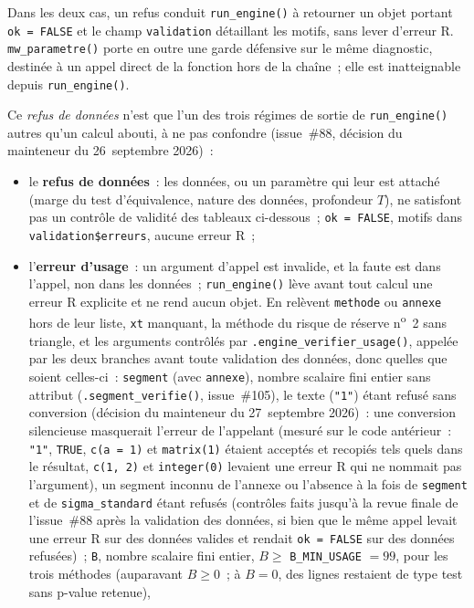 \documentclass[a4paper,11pt]{article}
\newcommand{\code}[1]{\texttt{\small #1}}
\begin{document}
Dans les deux cas, un refus conduit \code{run\_engine()} à
retourner un objet portant \code{ok = FALSE} et le champ \code{validation}
détaillant les motifs, sans lever d'erreur R.
\code{mw\_parametre()} porte en outre une garde défensive sur le même
diagnostic, destinée à un appel direct de la fonction hors de la chaîne~; elle
est inatteignable depuis \code{run\_engine()}.

Ce \emph{refus de données} n'est que l'un des trois régimes de sortie de \code{run\_engine()}
autres qu'un calcul abouti, à ne pas confondre (issue~\#88, décision du mainteneur du
26~septembre 2026)~:
\begin{itemize}[itemsep=2pt]
\item le \textbf{refus de données}~: les données, ou un paramètre qui leur est attaché (marge du
  test d'équivalence, nature des données, profondeur $T$), ne satisfont pas un contrôle de
  validité des tableaux ci-dessous~; \code{ok = FALSE}, motifs dans
  \code{validation\$erreurs}, aucune erreur R~;
\item l'\textbf{erreur d'usage}~: un argument d'appel est invalide, et la faute est dans l'appel,
  non dans les données~; \code{run\_engine()} lève avant tout calcul une erreur R explicite et ne
  rend aucun objet. En relèvent \code{methode} ou \code{annexe} hors de leur liste, \code{xt}
  manquant, la méthode du risque de réserve n\textsuperscript{o}~2 sans triangle, et les
  arguments contrôlés par \code{.engine\_verifier\_usage()}, appelée par les deux branches avant
  toute validation des données, donc quelles que soient celles-ci~: \code{segment} (avec
  \code{annexe}), nombre scalaire fini entier sans attribut (\code{.segment\_verifie()},
  issue~\#105), le texte (\code{"1"}) étant refusé sans conversion (décision du mainteneur du
  27~septembre 2026)~: une conversion silencieuse masquerait l'erreur de l'appelant (mesuré sur
  le code antérieur~: \code{"1"}, \code{TRUE}, \code{c(a = 1)} et \code{matrix(1)} étaient
  acceptés et recopiés tels quels dans le résultat, \code{c(1, 2)} et \code{integer(0)} levaient
  une erreur R qui ne nommait pas l'argument), un segment inconnu de l'annexe ou l'absence à la fois de \code{segment} et de
  \code{sigma\_standard} étant refusés (contrôles faits jusqu'à la revue finale de l'issue~\#88
  après la validation des données, si bien que le même appel levait une erreur R sur des données
  valides et rendait \code{ok = FALSE} sur des données refusées)~;
  \code{B}, nombre scalaire fini entier, $B \ge$ \code{B\_MIN\_USAGE} $= 99$, pour les trois méthodes
  (auparavant $B \ge 0$~; à $B = 0$, des lignes restaient de type test sans p-value retenue),

\end{itemize}
\end{document}
